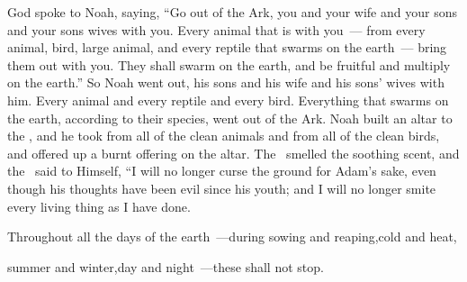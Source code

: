 \begin{inparaenum}
   God spoke to Noah, saying,%
   ``Go out of the Ark, you and your wife and your sons and your sons wives with you.%
   Every animal that is with you~--- from every animal, bird, large animal, and every reptile that swarms on the earth~--- bring them out with you. They shall swarm on the earth, and be fruitful and multiply on the earth.''%
   So Noah went out, his sons and his wife and his sons' wives with him.%
   Every animal and every reptile and every bird. Everything that swarms on the earth, according to their species, went out of the Ark.%
   Noah built an altar to the \lord, and he took from all of the clean animals and from all of the clean birds, and offered up a burnt offering on the altar.%
   The \lord\ smelled the soothing scent, and the \lord\ said to Himself, ``I will no longer curse the ground for Adam's sake, even though his thoughts have been evil since his youth; and I will no longer smite every living thing as I have done.%
  
  \pc {} Throughout all the days of the earth~---\pa during sowing and reaping,\pa cold and heat,%
  
  \pc summer and winter,\pa day and night~---\pa these shall not stop.%
\end{inparaenum}
